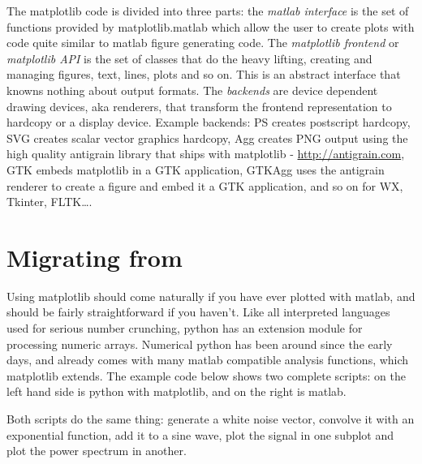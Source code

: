 \documentclass[twoside,10pt]{book}
\begin{document}
The matplotlib code is divided into three parts: the \textit{matlab
  interface} is the set of functions provided by matplotlib.matlab
which allow the user to create plots with code quite similar to matlab
figure generating code.  The \textit{matplotlib frontend} or
\textit{matplotlib API} is the set of classes that do the heavy
lifting, creating and managing figures, text, lines, plots and so on.
This is an abstract interface that knowns nothing about output
formats.  The \textit{backends} are device dependent drawing devices,
aka renderers, that transform the frontend representation to hardcopy
or a display device.  Example backends: PS creates postscript
hardcopy, SVG creates scalar vector graphics hardcopy, Agg creates PNG
output using the high quality antigrain library that ships with
matplotlib - \url{http://antigrain.com}, GTK embeds matplotlib in a
GTK application, GTKAgg uses the antigrain renderer to create a figure
and embed it a GTK application, and so on for WX, Tkinter, FLTK\dots.



\section*{\myheadersize Migrating from \matlab}

Using matplotlib should come naturally if you have ever plotted with
matlab, and should be fairly straightforward if you haven't.  Like all
interpreted languages used for serious number crunching, python has an
extension module for processing numeric arrays.  Numerical python has
been around since the early days, and already comes with many matlab
compatible analysis functions, which matplotlib extends.  The example
code below shows two complete scripts: on the left hand side is python
with matplotlib, and on the right is matlab.  

Both scripts do the same thing: generate a white noise vector,
convolve it with an exponential function, add it to a sine wave, plot
the signal in one subplot and plot the power spectrum in another.
\end{document}

